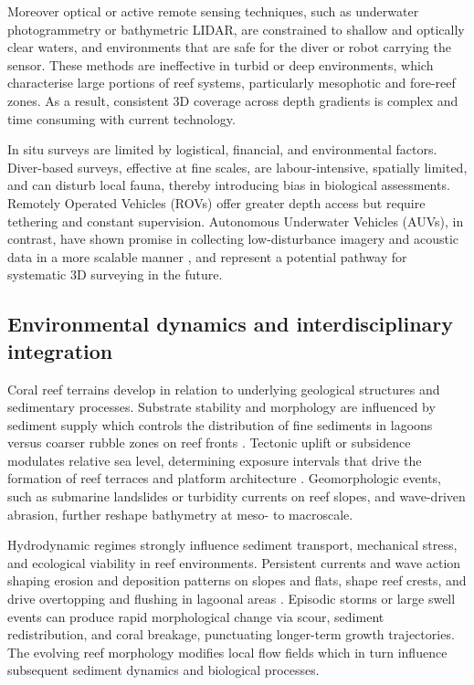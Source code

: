 Moreover optical or active remote sensing techniques, such as underwater photogrammetry or bathymetric LIDAR, are constrained to shallow and optically clear waters, and environments that are safe for the diver or robot carrying the sensor. These methods are ineffective in turbid or deep environments, which characterise large portions of reef systems, particularly mesophotic and fore-reef zones. As a result, consistent 3D coverage across depth gradients is complex and time consuming with current technology.

In situ surveys are limited by logistical, financial, and environmental factors. Diver-based surveys, effective at fine scales, are labour-intensive, spatially limited, and can disturb local fauna, thereby introducing bias in biological assessments. Remotely Operated Vehicles (ROVs) offer greater depth access but require tethering and constant supervision. Autonomous Underwater Vehicles (AUVs), in contrast, have shown promise in collecting low-disturbance imagery and acoustic data in a more scalable manner \cite{GonzalezRivero2016,Modasshir2018}, and represent a potential pathway for systematic 3D surveying in the future.


\subsection{Environmental dynamics and interdisciplinary integration}
Coral reef terrains develop in relation to underlying geological structures and sedimentary processes. Substrate stability and morphology are influenced by sediment supply which controls the distribution of fine sediments in lagoons versus coarser rubble zones on reef fronts \cite{Montaggioni2005}. Tectonic uplift or subsidence modulates relative sea level, determining exposure intervals that drive the formation of reef terraces and platform architecture \cite{Hopley2014}. Geomorphologic events, such as submarine landslides or turbidity currents on reef slopes, and wave-driven abrasion, further reshape bathymetry at meso- to macroscale.

Hydrodynamic regimes strongly influence sediment transport, mechanical stress, and ecological viability in reef environments. Persistent currents and wave action shaping erosion and deposition patterns on slopes and flats, shape reef crests, and drive overtopping and flushing in lagoonal areas \cite{Lowe2009}. Episodic storms or large swell events can produce rapid morphological change via scour, sediment redistribution, and coral breakage, punctuating longer-term growth trajectories. The evolving reef morphology modifies local flow fields which in turn influence subsequent sediment dynamics and biological processes.

